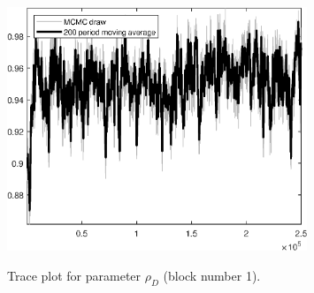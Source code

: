 \begin{figure}[H]
\centering
  \includegraphics[width=0.8\textwidth]{BRS_aggregate/graphs/TracePlot_rho_D_blck_1}\\
    \caption{Trace plot for parameter ${\rho_D}$ (block number 1).}
\end{figure}
